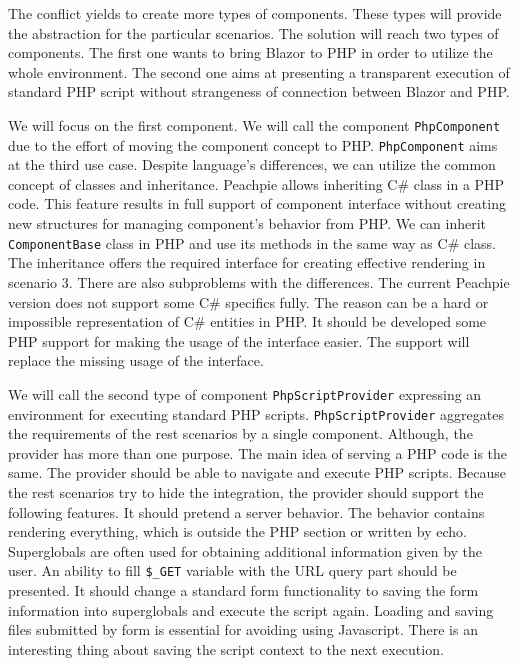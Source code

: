 The conflict yields to create more types of components.
These types will provide the abstraction for the particular scenarios.
The solution will reach two types of components.
The first one wants to bring Blazor to PHP in order to utilize the whole environment.
The second one aims at presenting a transparent execution of standard PHP script without strangeness of connection between Blazor and PHP.
\par
We will focus on the first component.
We will call the component \texttt{PhpComponent} due to the effort of moving the component concept to PHP.
\texttt{PhpComponent} aims at the third use case.
Despite language's differences, we can utilize the common concept of classes and inheritance.
Peachpie allows inheriting C\# class in a PHP code.
This feature results in full support of component interface without creating new structures for managing component's behavior from PHP.
We can inherit \texttt{ComponentBase} class in PHP and use its methods in the same way as C\# class.
The inheritance offers the required interface for creating effective rendering in scenario 3.
There are also subproblems with the differences.
The current Peachpie version does not support some C\# specifics fully.
The reason can be a hard or impossible representation of C\# entities in PHP.
It should be developed some PHP support for making the usage of the interface easier.
The support will replace the missing usage of the interface.
\par
We will call the second type of component \texttt{PhpScriptProvider} expressing an environment for executing standard PHP scripts.
\texttt{PhpScriptProvider} aggregates the requirements of the rest scenarios by a single component.
Although, the provider has more than one purpose.
The main idea of serving a PHP code is the same.
The provider should be able to navigate and execute PHP scripts.
Because the rest scenarios try to hide the integration, the provider should support the following features.
It should pretend a server behavior.
The behavior contains rendering everything, which is outside the PHP section or written by echo.
Superglobals are often used for obtaining additional information given by the user.
An ability to fill \texttt{\$\_GET} variable with the URL query part should be presented.
It should change a standard form functionality to saving the form information into superglobals and execute the script again.
Loading and saving files submitted by form is essential for avoiding using Javascript.
There is an interesting thing about saving the script context to the next execution.
